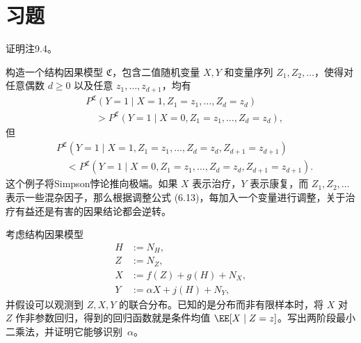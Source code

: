 \clearpage
\section{习题}
\setcounter{problem}{9}

\begin{problem}[充分性]
证明注9.4。
\end{problem}

\begin{problem}[Simpson悖论]
构造一个结构因果模型 $\mathfrak C$，包含二值随机变量 $X,Y$ 和变量序列 $Z_1,Z_2,\ldots$，使得对任意偶数 $d\geq0$ 以及任意 $z_1,\ldots,z_{d+1}$，均有
\[
\begin{aligned}
 &P^{\mathfrak C}(Y=1\mid X=1,Z_1=z_1,\ldots,Z_d=z_d)\\
 &\quad>P^{\mathfrak C}(Y=1\mid X=0,Z_1=z_1,\ldots,Z_d=z_d),
\end{aligned}
\]
但
\[
\begin{aligned}
 &P^{\mathfrak C}(Y=1\mid X=1,Z_1=z_1,\ldots,Z_d=z_d,Z_{d+1}=z_{d+1})\\
 &\quad<P^{\mathfrak C}(Y=1\mid X=0,Z_1=z_1,\ldots,Z_d=z_d,Z_{d+1}=z_{d+1}).
\end{aligned}
\]
这个例子将Simpson悖论推向极端。如果 $X$ 表示治疗，$Y$ 表示康复，而 $Z_1,Z_2,\ldots$ 表示一些混杂因子，那么根据调整公式 (6.13)，每加入一个变量进行调整，关于治疗有益还是有害的因果结论都会逆转。
\end{problem}

\begin{problem}[工具变量]
考虑结构因果模型
\[
\begin{aligned}
 H&:=N_H,\\
 Z&:=N_Z,\\
 X&:=f(Z)+g(H)+N_X,\\
 Y&:=\alpha X+j(H)+N_Y,
\end{aligned}
\]
并假设可以观测到 $Z,X,Y$ 的联合分布。已知的是分布而非有限样本时，将 $X$ 对 $Z$ 作非参数回归，得到的回归函数就是条件均值 $\EE[X\mid Z=z]$。写出两阶段最小二乘法，并证明它能够\mbox{识别 $\alpha$}。
\end{problem}
